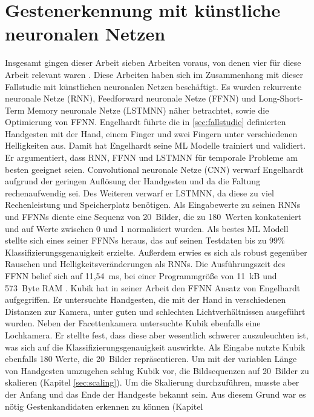 \section{Gestenerkennung mit künstliche neuronalen Netzen}
Insgesamt gingen dieser Arbeit sieben Arbeiten voraus, von denen vier für diese Arbeit relevant waren \cite{engelhardtThesis, kubikThesis, klischThesis, gieseThesis}.
Diese Arbeiten haben sich im Zusammenhang mit dieser Fallstudie mit künstlichen neuronalen Netzen beschäftigt. Es wurden rekurrente neuronale Netze (RNN), Feedforward neuronale Netze (FFNN) und
Long-Short-Term Memory neuronale Netze (LSTMNN) näher betrachtet, sowie die Optimierung von FFNN.
\newline
\newline
Engelhardt führte die in \ref{sec:fallstudie} definierten Handgesten mit der Hand, einem Finger und zwei Fingern unter verschiedenen Helligkeiten aus. Damit hat Engelhardt seine ML Modelle trainiert und validiert. Er
argumentiert, dass RNN, FFNN und LSTMNN für temporale Probleme am besten geeignet seien. Convolutional neuronale
Netze (CNN) verwarf Engelhardt aufgrund der geringen Auflösung der Handgesten und da die Faltung rechenaufwendig sei. Des Weiteren verwarf er LSTMNN, da diese zu viel Rechenleistung und Speicherplatz
benötigen. Als Eingabewerte zu seinen RNNs und FFNNs diente eine Sequenz von 20~Bilder, die zu 180~Werten konkateniert und auf Werte zwischen 0 und 1 normalisiert wurden. Als bestes ML Modell stellte sich eines
seiner FFNNs heraus, das auf seinen Testdaten bis zu 99\% Klassifizierungsgenauigkeit erzielte. Außerdem erwies es sich als robust gegenüber Rauschen und Helligkeitsveränderungen als RNNs. Die Ausführungszeit
des FFNN belief sich auf 11,54~ms, bei einer Programmgröße von 11~kB und 573~Byte RAM \cite{engelhardtThesis}.
\newline
\newline
Kubik hat in seiner Arbeit den FFNN Ansatz von Engelhardt aufgegriffen. Er untersuchte Handgesten, die mit der Hand in verschiedenen Distanzen zur Kamera, unter guten und schlechten Lichtverhältnissen ausgeführt wurden.
Neben der Facettenkamera untersuchte Kubik ebenfalls eine Lochkamera. Er stellte fest, dass diese aber wesentlich schwerer auszuleuchten ist, was sich auf die
Klassifizierungsgenauigkeit auswirkte. Als Eingabe nutzte Kubik ebenfalls 180 Werte, die 20~Bilder repräsentieren. Um mit der variablen Länge von Handgesten umzugehen schlug Kubik vor, die Bildsequenzen auf 20~Bilder zu
skalieren (Kapitel \ref{sec:scaling}). Um die Skalierung durchzuführen, musste aber der Anfang und das Ende der Handgeste bekannt sein. Aus diesem Grund war es nötig Gestenkandidaten erkennen zu können (Kapitel
